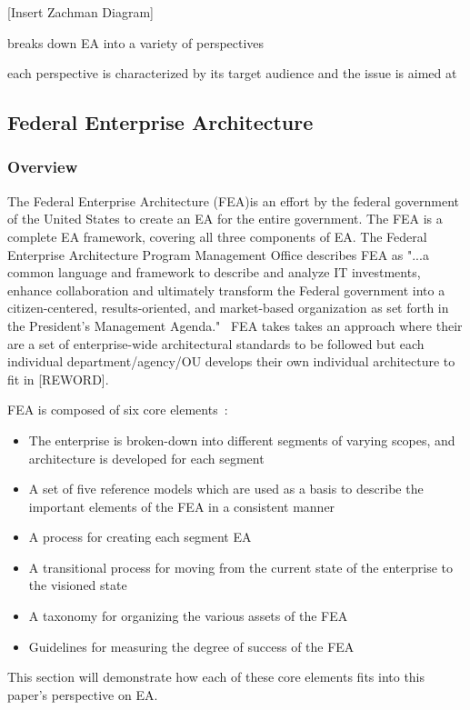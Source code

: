 [Insert Zachman Diagram]

breaks down EA into a variety of perspectives

each perspective is characterized by its target audience and the issue is aimed at

\subsection{Federal Enterprise Architecture}
\subsubsection{Overview}
The Federal Enterprise Architecture (FEA)is an effort by the federal government of the United States to create an EA for the entire government. The FEA is a complete EA framework, covering all three components of EA. The Federal Enterprise Architecture Program Management Office describes FEA as "...a common language and framework to describe and analyze IT investments, enhance collaboration and ultimately transform the Federal government into a citizen-centered, results-oriented, and market-based organization as set forth in the President's Management Agenda."~\cite{FederalEnterpriseArchitectureProgramManagementOffice} FEA takes takes an approach where their are a set of enterprise-wide architectural standards to be followed but each individual department/agency/OU develops their own individual architecture to fit in [REWORD].

FEA is composed of six core elements~\cite{sessions2007}:
\begin{itemize}
    \item The enterprise is broken-down into different segments of varying scopes, and architecture is developed for each segment
    \item A set of five reference models which are used as a basis to describe the important elements of the FEA in a consistent manner
    \item A process for creating each segment EA
    \item A transitional process for moving from the current state of the enterprise to the visioned state
    \item A taxonomy for organizing the various assets of the FEA
    \item Guidelines for measuring the degree of success of the FEA
\end{itemize}

This section will demonstrate how each of these core elements fits into this paper's perspective on EA.

